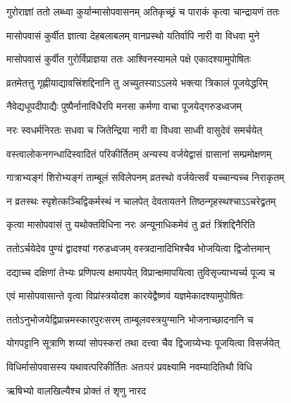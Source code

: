 \twolineshloka
{गुरोराज्ञां ततो लब्ध्वा कुर्यान्मासोपवासनम्}
{अतिकृच्छ्रं च पाराकं कृत्वा चान्द्रायणं ततः} %

\twolineshloka
{मासोपवासं कुर्वीत ज्ञात्वा देहबलाबलम्}
{वानप्रस्थो यतिर्वापि नारी वा विधवा मुने} %

\twolineshloka
{मासोपवासं कुर्वीत गुरोर्विप्राज्ञया ततः}
{आश्विनस्यामले पक्षे एकादश्यामुपोषितः} %

\twolineshloka
{व्रतमेतत्तु गृह्णीयाद्यावत्त्रिंशद्दिनानि तु}
{अच्युतस्याऽऽलये भक्त्या त्रिकालं पूजयेद्धरिम्} %

\twolineshloka
{नैवेद्यधूपदीपाद्यैः पुष्पैर्नानाविधैरपि}
{मनसा कर्मणा वाचा पूजयेद्गरुडध्वजम्} %

\twolineshloka
{नरः स्वधर्मनिरतः सधवा च जितेन्द्रिया}
{नारी वा विधवा साध्वी वासुदेवं समर्चयेत्} %

\twolineshloka
{वस्त्वालोकनगन्धादिस्वादितं परिकीर्तितम्}
{अन्यस्य वर्जयेद्वासं ग्रासानां सम्प्रमोक्षणम्} %

\twolineshloka
{गात्राभ्यङ्गं शिरोभ्यङ्गं ताम्बूलं सविलेपनम्}
{व्रतस्थो वर्जयेत्सर्वं यच्चान्यच्च निराकृतम्} %

\twolineshloka
{न व्रतस्थः स्पृशेत्कञ्चिद्विकर्मस्थं न चालपेत्}
{देवतायतने तिष्ठन्गृहस्थश्चाऽऽचरेद्व्रतम्} %

\twolineshloka
{कृत्वा मासोपवासं तु यथोक्तविधिना नरः}
{अन्यूनाधिकमेवं तु व्रतं त्रिंशद्दिनैरिति} %

\twolineshloka
{ततोऽर्चयेदेव पुण्यं द्वादश्यां गरुडध्वजम्}
{वस्त्रदानादिभिश्चैव भोजयित्वा द्विजोत्तमान्} %

\twolineshloka
{दद्याच्च दक्षिणां तेभ्यः प्रणिपत्य क्षमापयेत्}
{विप्रान्क्षमापयित्वा तुविसृज्याभ्यर्च्य पूज्य च} %

\twolineshloka
{एवं मासोपवासान्ते वृत्वा विप्रांस्त्रयोदश}
{कारयेद्वैष्णवं यज्ञमेकादश्यामुपोषितः} %

\twolineshloka
{ततोऽनुभोजयेद्विप्रान्नमस्कारपुरःसरम्}
{ताम्बूलवस्त्रयुग्मानि भोजनाच्छादनानि च} %

\twolineshloka
{योगपट्टानि सूत्राणि शय्यां सोपस्करां तथा}
{दत्त्वा चैव द्विजाग्र्येभ्यः पूजयित्वा विसर्जयेत्} %

\twolineshloka
{विधिर्मासोपवासस्य यथावत्परिकीर्तितः}
{अतःपरं प्रवक्ष्यामि नवम्यादितिथौ विधि} %


\onelineshloka
{ऋषिभ्यो वालखिल्यैश्च प्रोक्तं तं शृणु नारद} %





